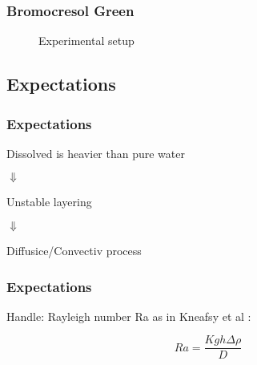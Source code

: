 \begin{frame}
	\frametitle{Bromocresol Green}
	
	\begin{figure}
	  \centering
	  \caption{Experimental setup}
	\end{figure}
\end{frame}

\subsection{Expectations}
\begin{frame}
	\frametitle{Expectations}
	\vspace{1cm} %
	
	\centering
	Dissolved \COT is heavier than pure water
	
	\pause
	$\Downarrow$
	
	Unstable layering
	
	\pause
	$\Downarrow$
	
	Diffusice/Convectiv process
	
\end{frame}

\begin{frame}
	\frametitle{Expectations}
	\vspace{1cm} %
	
	Handle: Rayleigh number Ra as in Kneafsy et al \cite{2010:CO2}:
	
	\begin{equation*}
	  Ra = \frac{Kgh \Delta\rho}{D}
	\end{equation*}

	
\end{frame}

